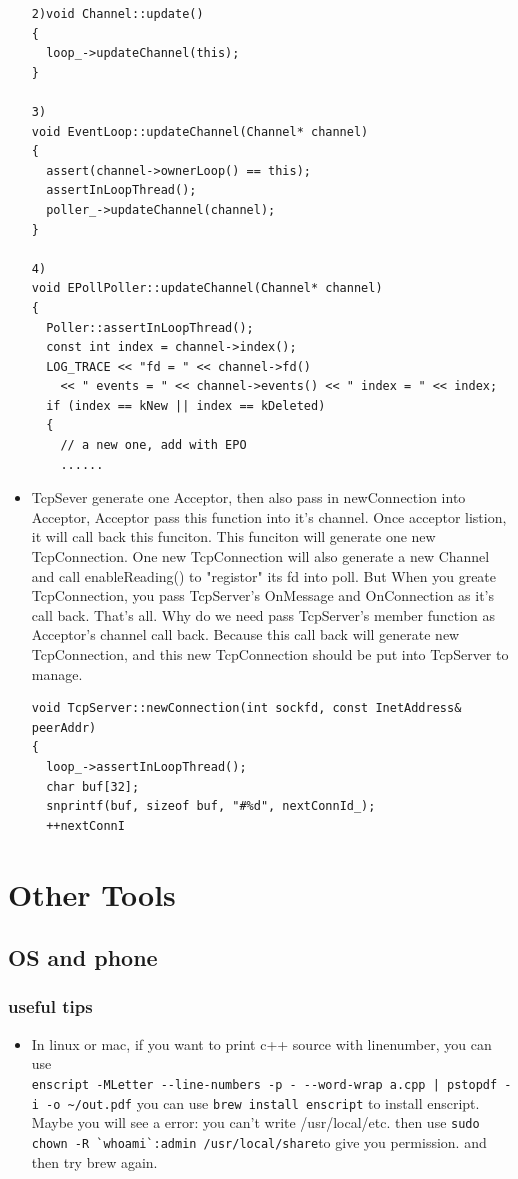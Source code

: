 \documentclass[paper=8.5in:11in, twoside, 12pt, pagesize=pdftex]{book}
\begin{document}
\begin{itemize}
\begin{lstlisting}[]
2)void Channel::update()
{
  loop_->updateChannel(this);
}

3)
void EventLoop::updateChannel(Channel* channel)
{
  assert(channel->ownerLoop() == this);
  assertInLoopThread();
  poller_->updateChannel(channel);
}

4)
void EPollPoller::updateChannel(Channel* channel)
{
  Poller::assertInLoopThread();
  const int index = channel->index();
  LOG_TRACE << "fd = " << channel->fd()
    << " events = " << channel->events() << " index = " << index;
  if (index == kNew || index == kDeleted)
  {
    // a new one, add with EPO
    ......
\end{lstlisting}

\item TcpSever generate one Acceptor, then also pass in newConnection into Acceptor, Acceptor pass this function into it's channel.  Once acceptor listion, it will call back this funciton.  This funciton will generate one new TcpConnection. One new TcpConnection will also generate a new Channel and call enableReading() to "registor" its fd into poll. But When you greate TcpConnection, you pass TcpServer's OnMessage and OnConnection as it's call back. That's all. Why do we need pass TcpServer's member function as Acceptor's channel call back. Because this call back will generate new TcpConnection, and this new TcpConnection should be put into TcpServer to manage.  

\begin{lstlisting}[]
void TcpServer::newConnection(int sockfd, const InetAddress& peerAddr)
{
  loop_->assertInLoopThread();
  char buf[32];
  snprintf(buf, sizeof buf, "#%d", nextConnId_);
  ++nextConnI
\end{lstlisting}

\end{itemize}



\chapter{Other Tools}

\section{OS and phone}

\subsection{useful tips}
\begin{itemize}
\item In linux or mac, if you want to print c++ source with linenumber, you can use \\
\verb=enscript -MLetter --line-numbers -p - --word-wrap a.cpp | pstopdf -i -o ~/out.pdf=
you can use \verb=brew install enscript= to install enscript. Maybe you will see a error: you can't write /usr/local/etc.
then use \verb=sudo chown -R `whoami`:admin /usr/local/share=to give you permission. and then try brew again. 
\end{itemize}
\end{document}
